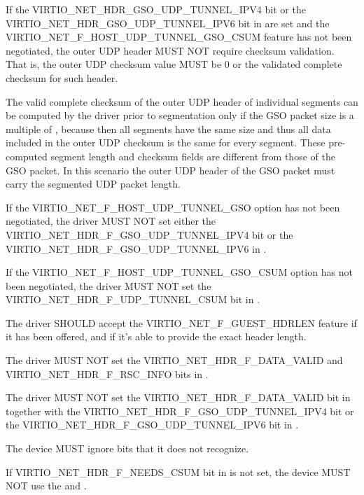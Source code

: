 If the VIRTIO_NET_HDR_GSO_UDP_TUNNEL_IPV4 bit or the
VIRTIO_NET_HDR_GSO_UDP_TUNNEL_IPV6 bit in  are set
and the VIRTIO_NET_F_HOST_UDP_TUNNEL_GSO_CSUM feature has not
been negotiated, the
outer UDP header MUST NOT require checksum validation. That is, the
outer UDP checksum value MUST be 0 or the validated complete checksum
for such header.

\begin{note}
The valid complete checksum of the outer UDP header of individual segments
can be computed by the driver prior to segmentation only if the GSO packet
size is a multiple of , because then all segments
have the same size and thus all data included in the outer UDP
checksum is the same for every segment. These pre-computed segment
length and checksum fields are different from those of the GSO
packet.
In this scenario the outer UDP header of the GSO packet must carry the
segmented UDP packet length.
\end{note}

If the VIRTIO_NET_F_HOST_UDP_TUNNEL_GSO option has not
been negotiated, the driver MUST NOT set either the VIRTIO_NET_HDR_F_GSO_UDP_TUNNEL_IPV4
bit or the VIRTIO_NET_HDR_F_GSO_UDP_TUNNEL_IPV6 in .

If the VIRTIO_NET_F_HOST_UDP_TUNNEL_GSO_CSUM option has not been negotiated,
the driver MUST NOT set the VIRTIO_NET_HDR_F_UDP_TUNNEL_CSUM bit
in .

The driver SHOULD accept the VIRTIO_NET_F_GUEST_HDRLEN feature if it has
been offered, and if it's able to provide the exact header length.

The driver MUST NOT set the VIRTIO_NET_HDR_F_DATA_VALID and
VIRTIO_NET_HDR_F_RSC_INFO bits in .

The driver MUST NOT set the VIRTIO_NET_HDR_F_DATA_VALID bit in 
together with the VIRTIO_NET_HDR_F_GSO_UDP_TUNNEL_IPV4 bit or the
VIRTIO_NET_HDR_F_GSO_UDP_TUNNEL_IPV6 bit in .

The device MUST ignore  bits that it does not recognize.

If VIRTIO_NET_HDR_F_NEEDS_CSUM bit in  is not set, the
device MUST NOT use the  and .

